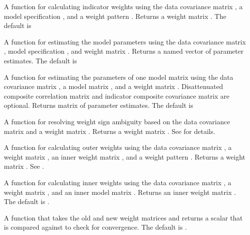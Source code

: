 \documentclass[a4paper]{book}
\begin{document}
%
\begin{Arguments}
\begin{ldescription}
\item[\code{weightFun}] A function for calculating indicator weights using the data covariance matrix
, a model specification , and a weight pattern . Returns
a weight matrix . The default is 

\item[\code{parameterEstim}] A function for estimating the model parameters using
the data covariance matrix , model specification , 
and weight matrix . Returns a named vector of parameter estimates.
The default is 

\item[\code{estimator}] A function for estimating the parameters of one model matrix using
the data covariance matrix , a model matrix , and a weight matrix
. Disattenuated composite correlation matrix  and indicator composite 
covariance matrix  are optional. Returns matrix of parameter estimates.
The default is 

\item[\code{weightSign}] A function for resolving weight sign ambiguity based on the data covariance matrix
 and a weight matrix .  Returns
a weight matrix . See 
for details.

\item[\code{outerEstim}] A function for calculating outer weights using the data covariance matrix
, a weight matrix , an inner weight matrix ,
and a weight pattern . Returns
a weight matrix . See .

\item[\code{innerEstim}] A function for calculating inner weights using  the data covariance matrix
, a weight matrix , and an inner model matrix . Returns
an inner weight matrix . The default is .

\item[\code{convCheck}] A function that takes the old  and new weight  matrices and
returns a scalar that is compared against  to check for convergence. The default
is .


\end{ldescription}
\end{Arguments}
\end{document}
